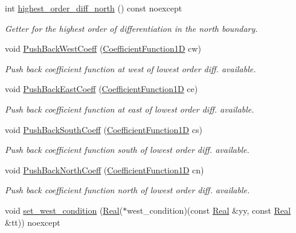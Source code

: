 \begin{DoxyCompactItemize}
int \hyperlink{classmtk_1_1RobinBCDescriptor2D_a77d5d6b65f39bc74072fbc1d638eb899}{highest\+\_\+order\+\_\+diff\+\_\+north} () const noexcept
\begin{DoxyCompactList}\small\item\em Getter for the highest order of differentiation in the north boundary. \end{DoxyCompactList}\item 
void \hyperlink{classmtk_1_1RobinBCDescriptor2D_a671a38d5ea78be8f0a88ccf034d09987}{Push\+Back\+West\+Coeff} (\hyperlink{group__c07-mim__ops_gaa79593eeb6676d6011db339e01983909}{Coefficient\+Function1\+D} cw)
\begin{DoxyCompactList}\small\item\em Push back coefficient function at west of lowest order diff. available. \end{DoxyCompactList}\item 
void \hyperlink{classmtk_1_1RobinBCDescriptor2D_a7cc1e6ca729b8b092eb73161eb244160}{Push\+Back\+East\+Coeff} (\hyperlink{group__c07-mim__ops_gaa79593eeb6676d6011db339e01983909}{Coefficient\+Function1\+D} ce)
\begin{DoxyCompactList}\small\item\em Push back coefficient function at east of lowest order diff. available. \end{DoxyCompactList}\item 
void \hyperlink{classmtk_1_1RobinBCDescriptor2D_ad74c5d9f2c1d0359d350348ac2a7e61e}{Push\+Back\+South\+Coeff} (\hyperlink{group__c07-mim__ops_gaa79593eeb6676d6011db339e01983909}{Coefficient\+Function1\+D} cs)
\begin{DoxyCompactList}\small\item\em Push back coefficient function south of lowest order diff. available. \end{DoxyCompactList}\item 
void \hyperlink{classmtk_1_1RobinBCDescriptor2D_abc6e299516af5d1c5c2d04797875b446}{Push\+Back\+North\+Coeff} (\hyperlink{group__c07-mim__ops_gaa79593eeb6676d6011db339e01983909}{Coefficient\+Function1\+D} cn)
\begin{DoxyCompactList}\small\item\em Push back coefficient function north of lowest order diff. available. \end{DoxyCompactList}\item 
void \hyperlink{classmtk_1_1RobinBCDescriptor2D_aeaff87510dc1773effc0b5429579de23}{set\+\_\+west\+\_\+condition} (\hyperlink{group__c01-roots_gac080bbbf5cbb5502c9f00405f894857d}{Real}($\ast$west\+\_\+condition)(const \hyperlink{group__c01-roots_gac080bbbf5cbb5502c9f00405f894857d}{Real} \&yy, const \hyperlink{group__c01-roots_gac080bbbf5cbb5502c9f00405f894857d}{Real} \&tt)) noexcept

\end{DoxyCompactItemize}
